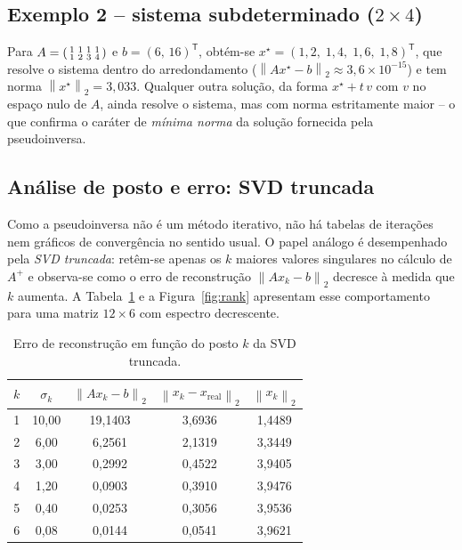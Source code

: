 \documentclass[12pt,a4paper,oneside]{report}
\newcommand{\norm}[1]{\left\lVert #1 \right\rVert}
\newcommand{\T}{^{\mathsf{T}}}
\newcommand{\Ap}{A^{+}}
\begin{document}
\subsection{\texorpdfstring{Exemplo 2 -- sistema subdeterminado ($2\times4$)}{Exemplo 2 -- sistema subdeterminado (2x4)}}

Para $A=\begin{psmallmatrix}1&1&1&1\\1&2&3&4\end{psmallmatrix}$ e $b=(6,\,16)\T$, obtém-se
$x^\star = (1{,}2,\;1{,}4,\;1{,}6,\;1{,}8)\T$, que resolve o sistema dentro do arredondamento
($\norm{Ax^\star-b}_2 \approx 3{,}6\times10^{-15}$) e tem norma $\norm{x^\star}_2 = 3{,}033$.
Qualquer outra solução, da forma $x^\star + t\,v$ com $v$ no espaço nulo de $A$, ainda resolve o
sistema, mas com norma estritamente maior -- o que confirma o caráter de \emph{mínima norma} da
solução fornecida pela pseudoinversa.

\subsection{Análise de posto e erro: SVD truncada}

Como a pseudoinversa não é um método iterativo, não há tabelas de iterações nem gráficos de
convergência no sentido usual. O papel análogo é desempenhado pela \emph{SVD truncada}:
retêm-se apenas os $k$ maiores valores singulares no cálculo de $\Ap$ e observa-se como o erro
de reconstrução $\norm{Ax_k - b}_2$ decresce à medida que $k$ aumenta. A Tabela~\ref{tab:rank}
e a Figura~\ref{fig:rank} apresentam esse comportamento para uma matriz $12\times6$ com
espectro decrescente.

\begin{table}[htbp]
\centering\small
\caption{Erro de reconstrução em função do posto $k$ da SVD truncada.}
\label{tab:rank}
\begin{tabular}{ccccc}
\toprule
$k$ & $\sigma_k$ & $\norm{Ax_k-b}_2$ & $\norm{x_k - x_{\text{real}}}_2$ & $\norm{x_k}_2$ \\
\midrule
1 & 10{,}00 & 19{,}1403 & 3{,}6936 & 1{,}4489 \\
2 & 6{,}00  & 6{,}2561  & 2{,}1319 & 3{,}3449 \\
3 & 3{,}00  & 0{,}2992  & 0{,}4522 & 3{,}9405 \\
4 & 1{,}20  & 0{,}0903  & 0{,}3910 & 3{,}9476 \\
5 & 0{,}40  & 0{,}0253  & 0{,}3056 & 3{,}9536 \\
6 & 0{,}08  & 0{,}0144  & 0{,}0541 & 3{,}9621 \\
\bottomrule
\end{tabular}
\end{table}
\end{document}
